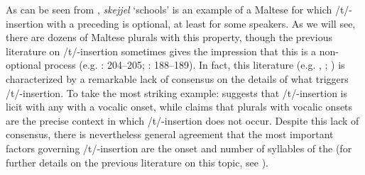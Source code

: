 \documentclass[output=paper]{langsci/langscibook}
\begin{document}
 As can be seen from ‎, \textit{skejjel} ‘schools’ is an example of a Maltese  for which /t/-insertion with a preceding  is optional, at least for some speakers. As we will see, there are dozens of Maltese plurals with this property, though the previous literature on /t/-insertion sometimes gives the impression that this is a non-optional process (e.g. \citealt{Cremona1938}: 204–205; \citealt{Sutcliffe1936}: 188–189). In fact, this literature (e.g. \citealt{Borg1974}, \citealt{Cremona1938}; \citealt{Fabri1994}) is characterized by a remarkable lack of consensus on the details of what triggers /t/-insertion. To take the most striking example: \citet[118]{Aquilina1965} suggests that /t/-insertion is licit with any  with a vocalic onset, while \citet[294]{Borg1974} claims that plurals with vocalic onsets are the precise context in which /t/-insertion does not occur. Despite this lack of consensus, there is nevertheless general agreement that the most important factors governing /t/-insertion are the onset and number of syllables of the  (for further details on the previous literature on this topic, see \citealt{LucasSpagnol2016}).
\end{document}

